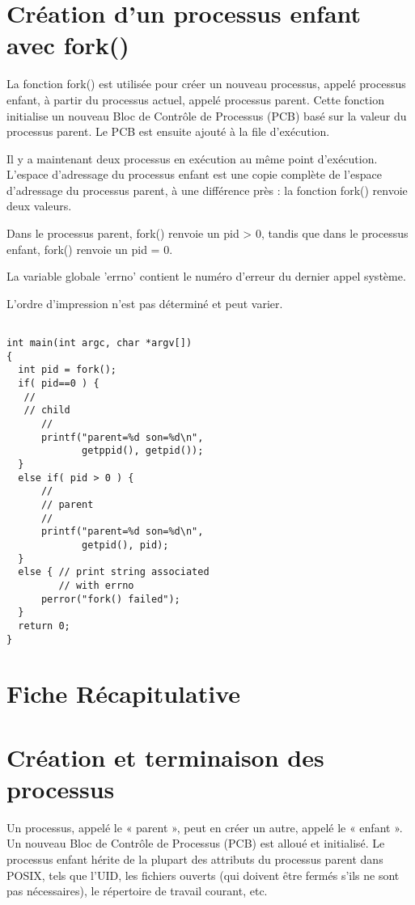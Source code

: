 \documentclass[12pt]{report}
\begin{document}
\section{Création d'un processus enfant avec fork()} 

La fonction fork() est utilisée pour créer un nouveau processus, appelé processus enfant, à partir du processus actuel, appelé processus parent. Cette fonction initialise un nouveau Bloc de Contrôle de Processus (PCB) basé sur la valeur du processus parent. Le PCB est ensuite ajouté à la file d'exécution. 

Il y a maintenant deux processus en exécution au même point d'exécution. L'espace d'adressage du processus enfant est une copie complète de l'espace d'adressage du processus parent, à une différence près : la fonction fork() renvoie deux valeurs. 

Dans le processus parent, fork() renvoie un pid > 0, tandis que dans le processus enfant, fork() renvoie un pid = 0. 

La variable globale 'errno' contient le numéro d'erreur du dernier appel système. 

L'ordre d'impression n'est pas déterminé et peut varier. 


\begin{lstlisting}

int main(int argc, char *argv[])
{
  int pid = fork();
  if( pid==0 ) { 
   //
   // child
      //
      printf("parent=%d son=%d\n",
             getppid(), getpid());
  }
  else if( pid > 0 ) {
      //
      // parent
      //
      printf("parent=%d son=%d\n",
             getpid(), pid);
  }
  else { // print string associated
         // with errno   
      perror("fork() failed"); 
  }
  return 0;
}

\end{lstlisting}


\section*{Fiche Récapitulative}
\section{Création et terminaison des processus}

Un processus, appelé le « parent », peut en créer un autre, appelé le « enfant ». Un nouveau Bloc de Contrôle de Processus (PCB) est alloué et initialisé. Le processus enfant hérite de la plupart des attributs du processus parent dans POSIX, tels que l'UID, les fichiers ouverts (qui doivent être fermés s'ils ne sont pas nécessaires), le répertoire de travail courant, etc.
\end{document}
